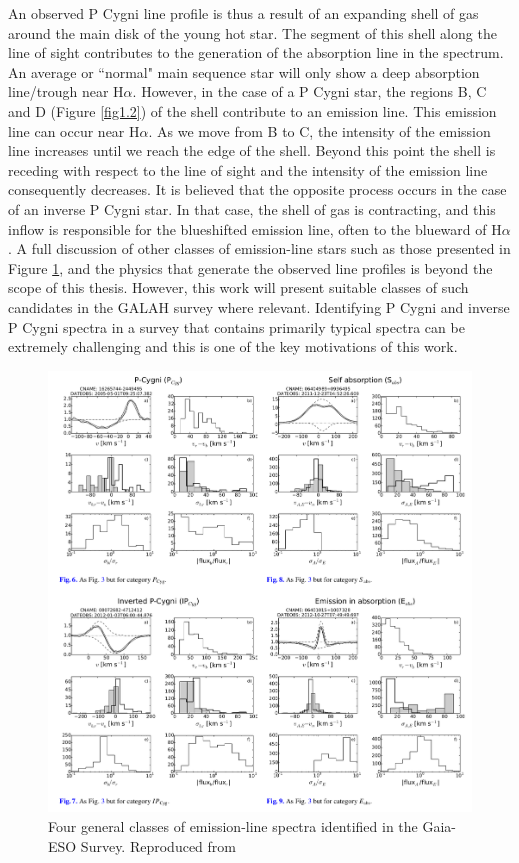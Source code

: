 An observed P Cygni line profile is thus a result of an expanding shell of gas around the main disk of the young hot star. The segment of this shell along the line of sight contributes to the generation of the absorption line in the spectrum. An average or ``normal" main sequence star will only show a deep absorption line/trough near H$\alpha$. However, in the case of a P Cygni star, the regions B, C and D (Figure \ref{fig1.2}) of the shell contribute to an emission line. This emission line can occur near H$\alpha$. As we move from B to C, the intensity of the emission line increases until we reach the edge of the shell. Beyond this point the shell is receding with respect to the line of sight and the intensity of the emission line consequently decreases. It is believed that the opposite process occurs in the case of an inverse P Cygni star. In that case, the shell of gas is contracting, and this inflow is responsible for the blueshifted emission line, often to the blueward of H$\alpha$. A full discussion of other classes of emission-line stars such as those presented in Figure \ref{fig1.3}, and the physics that generate the observed line profiles is beyond the scope of this thesis. However, this work will present suitable classes of such candidates in the GALAH survey where relevant. Identifying P Cygni and inverse P Cygni spectra in a survey that contains primarily typical spectra can be extremely challenging and this is one of the key motivations of this work.

\begin{figure}[!htb]
\centering
\includegraphics[scale=.50]{figures/p cygni and inverse p cygni.png}
\caption{Four general classes of emission-line spectra identified in the Gaia-ESO Survey. Reproduced from \citet{traven2015gaia}}
\label{fig1.3}
\end{figure}

